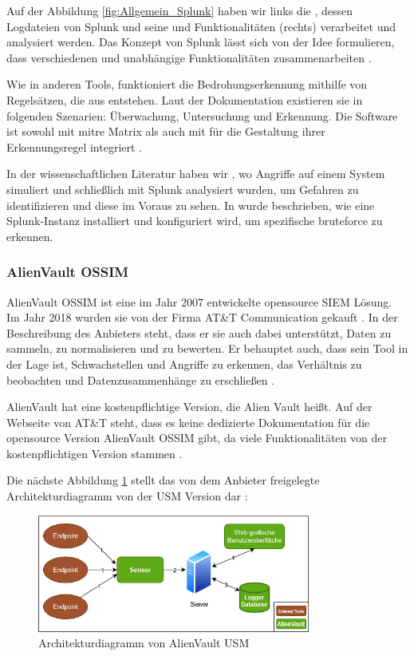 Auf der Abbildung \ref{fig:Allgemein_Splunk} haben wir links die , dessen Logdateien von Splunk und seine  und Funktionalitäten (rechts) verarbeitet und analysiert werden. Das Konzept von Splunk lässt sich von der Idee formulieren, dass verschiedenen und unabhängige Funktionalitäten zusammenarbeiten \citep{Splunk_platform}.

Wie in anderen Tools, funktioniert die Bedrohungserkennung mithilfe von Regelsätzen, die aus  entstehen. Laut der Dokumentation existieren sie in folgenden Szenarien: Überwachung, Untersuchung und Erkennung. Die Software ist sowohl mit \gls{mitre} Matrix als auch mit  für die Gestaltung ihrer Erkennungsregel integriert \citep{Splunk_usecases}.

In der wissenschaftlichen Literatur haben wir \cite{Su_SplunkDDOS}, wo Angriffe auf einem System simuliert und schließlich mit Splunk analysiert wurden, um Gefahren zu identifizieren und diese im Voraus zu sehen. In \cite{Selvaganesh_SplunkBruteForce} wurde beschrieben, wie eine Splunk-Instanz installiert und konfiguriert wird, um spezifische \gls{bruteforce} zu erkennen.

\subsubsection{AlienVault OSSIM}
AlienVault OSSIM ist eine im Jahr 2007 entwickelte \gls{opensource} \gls{SIEM} Lösung. Im Jahr 2018 wurden sie von der Firma AT\&T Communication gekauft  \citep{CBN_AV}. In der Beschreibung des Anbieters steht, dass er sie auch dabei unterstützt, Daten zu sammeln, zu normalisieren und zu bewerten. Er behauptet auch, dass sein Tool in der Lage ist, Schwachstellen und Angriffe zu erkennen, das Verhältnis zu beobachten und Datenzusammenhänge zu erschließen \citep{ATT_AVO}.

AlienVault hat eine kostenpflichtige Version, die Alien Vault  heißt. Auf der Webseite von AT\&T steht, dass es keine dedizierte Dokumentation für die \gls{opensource} Version AlienVault OSSIM gibt, da viele Funktionalitäten von der kostenpflichtigen Version stammen \citep{ATT_AVO}.

Die nächste Abbildung \ref{fig:AlienVault_Architektur} stellt das von dem Anbieter freigelegte Architekturdiagramm von der \gls{USM} Version dar \citep{ATT_AVO}:

\begin{figure}[H]
   \centering
   \includegraphics[width=0.8\textwidth]{assets/AlienVault.drawio.png}
   \caption[Architekturdiagramm von AlienVault \gls{USM}]
   {Architekturdiagramm von AlienVault \gls{USM}}
   \label{fig:AlienVault_Architektur}
   \centering
\end{figure}


